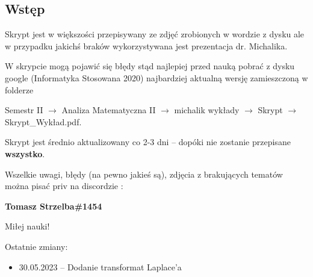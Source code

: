 \subsection{Wstęp}

Skrypt jest w większości przepisywany ze zdjęć zrobionych w wordzie z dysku ale w przypadku jakichś braków wykorzystywana jest
prezentacja dr. Michalika. 

W skrypcie mogą pojawić się błędy stąd najlepiej przed nauką pobrać z dysku google \linebreak (Informatyka Stosowana 2020) najbardziej aktualną wersję
zamieszczoną w folderze 

Semestr II $\rightarrow$ Analiza Matematyczna II $\rightarrow$ michalik wykłady $\rightarrow$ Skrypt $\rightarrow$ Skrypt\_Wykład.pdf.

Skrypt jest średnio aktualizowany co 2-3 dni -- dopóki nie zostanie przepisane \textbf{wszystko}. \medskip

Wszelkie uwagi, błędy (na pewno jakieś są), zdjęcia z brakujących tematów można pisać priv na discordzie : 

\textbf{Tomasz Strzelba\#1454}

Miłej nauki! \bigskip

Ostatnie zmiany:
\begin{itemize}
    \item 30.05.2023 -- Dodanie transformat Laplace'a
\end{itemize}